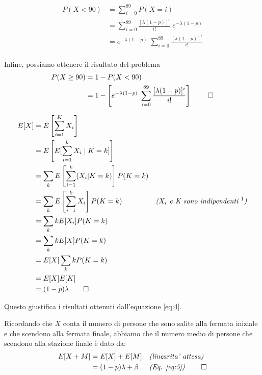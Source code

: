 \documentclass{homework}
\begin{document}
\[
\begin{split}
    P(X < 90) &= \sum^{89}_{i=0} P(X = i)\\
              &= \sum^{89}_{i=0} \frac{[\lambda(1 - p)]^i}{i!} \; e^{-\lambda(1-p)}\\
              &=  e^{-\lambda(1-p)} \; \sum^{89}_{i=0} \frac{[\lambda(1 - p)]^i}{i!} \\
\end{split}
\]

Infine, possiamo ottenere il risultato del problema
\[
\begin{split}
    P(X \geq 90) &= 1 - P(X < 90)\\
                 &= 1 - \left [ e^{-\lambda(1-p)} \; \sum^{89}_{i=0} \frac{[\lambda(1 - p)]^i}{i!} \right ] \; \qed
\end{split}
\]

\exercise*[2.b]
\begin{equation} \label{eq:5}
\begin{align}
            E[X] &= E \left [ \sum_{i=1}^K X_i \right ]\\
                 &= E \left [ E [ \sum_{i=1}^k X_i \mid K = k ] \right ]\\
                 &= \sum_{k} E \left[ \sum_{i=1}^{k}(X_i|K=k)\right] P(K=k)  \\
                 &= \sum_{k} E \left[ \sum_{i=1}^{k}X_i\right] P(K=k) & \emph{($X_i$ e K sono indipendenti \footnotemark)}\\
                 &= \sum_{k} kE[X_i] P(K=k) \\
                 &= \sum_{k} kE[X] P(K=k) \\
                 &= E[X]\sum_{k} k P(K=k) \\
                 &= E[X]E[K] \\
                 &= (1 -p)\lambda \qed
\end{align}
\end{equation}



Questo giustifica i risultati ottenuti dall'equazione \ref{eq:4}.

\exercise*[2.c]
Ricordando che $X$ conta il numero di persone che sono salite alla fermata 
iniziale e che scendono alla fermata finale, abbiamo che il numero medio di persone che scendono alla stazione finale è dato da:
\[
\begin{align}
    E[X + M] &= E[X] + E[M] &&\emph{(linearita' attesa)}\\ 
    &= (1 -p)\lambda + \beta &&\emph{(Eq. \ref{eq:5})} \; \qed
\end{align}
\]
\end{document}
